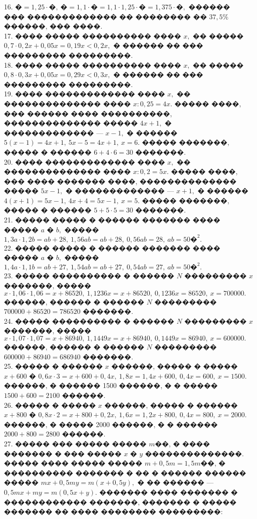 \documentclass[12pt]{article}
\begin{document}
16. $\text{�}=1,25\cdot\text{�},\ \text{�}=1,1\cdot\text{�}=1,1\cdot1,25\cdot\text{�}=1,375\cdot\text{�},$ ������ ��� ������������� �� �������� �� $37,5\%$ ������, ��� ����.\\
17. ���� ����� ���������� ���� $x,$ �� ����� $0,7\cdot0,2x+0,05x=0,19x<0,2x,$ � ������ �� ��� ��������� ���������.\\
18. ���� ����� ���������� ���� $x,$ �� ����� $0,8\cdot0,3x+0,05x=0,29x<0,3x,$ � ������ �� ��� ��������� ���������.\\
19. ���� ������������� ���� $x,$ �� �������������� ���� $x:0,25=4x.$ ����� ����, ��� ������ ���� ����������, �������������� ����� $4x+1,$ � ������������� --- $x-1,$ � ������ $5(x-1)=4x+1,\ 5x-5=4x+1,\ x=6.$ ����� �������, ����� � ������ $6+4\cdot6=30$ �������.\\
20. ���� ������������� ���� $x,$ �� �������������� ���� $x:0,2=5x.$ ����� ����, ��� ���� ������� ����, �������������� ����� $5x-1,$ � ������������� --- $x+1,$ � ������ $4(x+1)=5x-1,\ 4x+4=5x-1,\ x=5.$ ����� �������, ����� � ������ $5+5\cdot5=30$ �������.\\
21. ����� ����� � ������ ������� ���� ����� $a$ � $b,$ ����� $1,3a\cdot1,2b=ab+28,\ 1,56ab=ab+28,\ 0,56ab=28,\ ab=50\text{�}^2.$\\
22. ����� ����� � ������ ������� ���� ����� $a$ � $b,$ ����� $1,4a\cdot1,1b=ab+27,\ 1,54ab=ab+27,\ 0,54ab=27,\ ab=50\text{�}^2.$\\
23. ����� ���������� � ������ $N$ ��������� $x$ �������, ����� $x\cdot1,06\cdot1,06=x+86520,\ 1,1236x=x+86520,\ 0,1236x=86520,\ x=700000.$ ������, ������ � ������ $N$ ��������� $700000+86520=786520$ �������.\\
24. ����� ���������� � ������ $N$ ��������� $x$ �������, ����� $x\cdot1,07\cdot1,07=x+86940,\ 1,1449x=x+86940,\ 0,1449x=86940,\ x=600000.$ ������, ������ � ������ $N$ ��������� $600000+86940=686940$ �������.\\
25. ����� � ������ $x$ ������, ����� � ����� $x+600$ � $0,6x\cdot3=x+600+0,4x,\ 1,8x=1,4x+600,\ 0,4x=600,\ x=1500.$ ������, � ������ 1500 ������, � � ����� $1500+600=2100$ ������.\\
26. ����� � ����� $x$ ������, ����� � ������ $x+800$ � $0,8x\cdot2=x+800+0,2x,\ 1,6x=1,2x+800,\ 0,4x=800,\ x=2000.$ ������, � ����� 2000 ������, � � ������ $2000+800=2800$ ������.\\
27. ����� ��� ����� ����� $m$��, � ���� ������� � ��� ����� $x$ � $y$ ��������������. ����� ���� ����� ����� $m+0,5m=1,5m$��, � ���������� ������� � �� � ������ ������ ����� $mx+0,5my=m(x+0,5y),$ � �� ������ --- $0,5mx+my=m(0,5x+y).$ ������� ���� ������� � ������������ �������, ������� � ����� ������� �� ���� �������� ���������:\\
\end{document}
